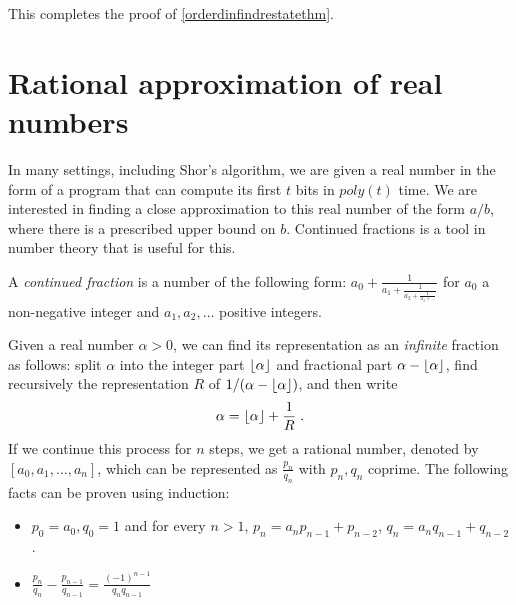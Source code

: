 This completes the proof of \cref{orderdinfindrestatethm}.

\section{Rational approximation of real
numbers}\label{19-Rational-approximation}

In many settings, including Shor's algorithm, we are given a real number
in the form of a program that can compute its first \(t\) bits in
\(poly(t)\) time. We are interested in finding a close approximation to
this real number of the form \(a/b\), where there is a prescribed upper
bound on \(b\). Continued fractions is a tool in number theory that is
useful for this.

A \emph{continued fraction} is a number of the following form:
\(a_0 + \frac{1}{a_1 + \frac{1}{a_2 + \tfrac{1}{a_3 + \ldots}} }\) for
\(a_0\) a non-negative integer and \(a_1,a_2,\ldots\) positive integers.

Given a real number \(\alpha>0\), we can find its representation as an
\emph{infinite} fraction as follows: split \(\alpha\) into the integer
part \(\lfloor \alpha \rfloor\) and fractional part \(\alpha - \lfloor \alpha \rfloor\),
find recursively the representation \(R\) of
\(1/(\alpha - \lfloor \alpha \rfloor)\), and then write
\begin{equation*}
\alpha = \lfloor \alpha \rfloor + \frac{1}{R} \;.
\end{equation*}
If we continue this process for \(n\) steps, we get a rational number,
denoted by \([a_0,a_1,\ldots,a_n]\), which can be represented as
\(\tfrac{p_n}{q_n}\) with \(p_n,q_n\) coprime. The following facts can
be proven using induction:

\begin{itemize}
\item
  \(p_0=a_0, q_0 =1\) and for every \(n>1\),
  \(p_n = a_np_{n-1} + p_{n-2}\), \(q_n = a_nq_{n-1} + q_{n-2}\).
\item
  \(\tfrac{p_n}{q_n} - \tfrac{p_{n-1}}{q_{n-1}} = \tfrac{(-1)^{n-1}}{q_nq_{n-1}}\)
\end{itemize}

